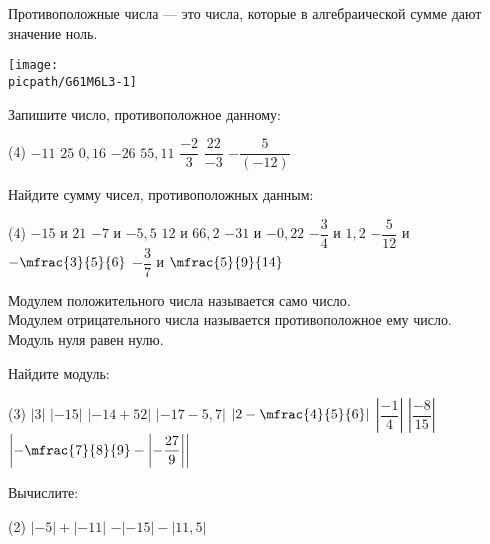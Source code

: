 \begin{class}[number=3]
	\begin{definit}
		Противоположные числа --- это числа, которые в алгебраической сумме дают значение ноль. \\
		\begin{minipage}[c]{0.45\textwidth}
			\texttt{[image: \\picpath/G61M6L3-1]}
		\end{minipage}
	\end{definit}
	\begin{listofex}
		\item Запишите число, противоположное данному:
		\begin{tasks}(4)
			\task \( -11  \)
			\task \( 25 \)
			\task \( 0,16 \)
			\task \( -26 \)
			\task \( 55,11 \)
			\task \( \dfrac{-2}{3} \)
			\task \( \dfrac{22}{-3} \)
			\task \( -\dfrac{5}{(-12)} \)
		\end{tasks}
		\item Найдите сумму чисел, противоположных данным:
		\begin{tasks}(4)
			\task \( -15  \) и \( 21 \)
			\task \( -7  \) и \( -5,5 \)
			\task \( 12  \) и \( 66,2 \)
			\task \( -31  \) и \( -0,22 \)
			\task \( -\dfrac{3}{4}  \) и \( 1,2 \)
			\task \( -\dfrac{5}{12}  \) и \( -\mfrac{3}{5}{6} \)
			\task \( -\dfrac{3}{7}  \) и \( \mfrac{5}{9}{14} \)
		\end{tasks}
	\end{listofex}
	\begin{definit}
	Модулем положительного числа называется само число. \\
	Модулем отрицательного числа называется противоположное ему число. \\
	Модуль нуля равен нулю.
	\end{definit}
	\begin{listofex}[resume]
		\item Найдите модуль:
		\begin{tasks}(3)
			\task \(  |3| \)
			\task \(  |-15| \)
			\task \( |-14+52|  \)
			\task \( |-17-5,7|  \)
			\task \(  \left|2-\mfrac{4}{5}{6}\right| \)
			\task \(  \left|\dfrac{-1}{4}\right| \)
			\task \(  \left|\dfrac{-8}{15}\right| \)
			\task \(  \left|-\mfrac{7}{8}{9} - \left|-\dfrac{27}{9}\right|\right| \)
		\end{tasks}
		\item Вычислите:
		\begin{tasks}(2)
			\task \(  |-5|+|-11| \)
			\task \(  -|-15|-|11,5| \)

\end{tasks}
\end{listofex}
\end{class}
